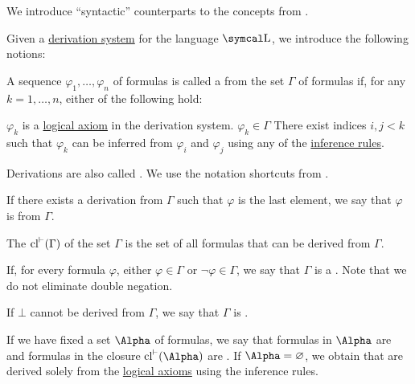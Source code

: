 \begin{definition}\label{def:first_order_proofs}
  We introduce \enquote{syntactic} counterparts to the concepts from .

  Given a \hyperref[def:first_order_derivation_system]{derivation system} for the language \( \CL \), we introduce the following notions:
  \begin{DefEnum}
    A sequence \( \varphi_1, \ldots, \varphi_n \) of formulas is called a  from the set \( \Gamma \) of formulas if, for any \( k = 1, \ldots, n \), either of the following hold:
    \begin{DefEnum}
       \( \varphi_k \) is a \hyperref[def:first_order_derivation_system/axioms]{logical axiom} in the derivation system.
       \( \varphi_k \in \Gamma \)
       There exist indices \( i, j < k \) such that \( \varphi_k \) can be inferred from \( \varphi_i \) and \( \varphi_j \) using any of the \hyperref[def:first_order_derivation_system/rules]{inference rules}.
    \end{DefEnum}

    Derivations are also called . We use the notation shortcuts from .

     If there exists a derivation from \( \Gamma \) such that \( \varphi \) is the last element, we say that \( \varphi \) is  from \( \Gamma \).

     The  \( \operatorname{cl}^{\vdash}(\Gamma) \) of the set \( \Gamma \) is the set of all formulas that can be derived from \( \Gamma \).

    If, for every formula \( \varphi \), either \( \varphi \in \Gamma \) or \( \neg \varphi \in \Gamma \), we say that \( \Gamma \) is a . Note that we do not eliminate double negation.

    If \( \bot \) cannot be derived from \( \Gamma \), we say that \( \Gamma \) is .

     If we have fixed a set \( \Alpha \) of formulas, we say that formulas in \( \Alpha \) are  and formulas in the closure \( \Cl^{\vdash}(\Alpha) \) are . If \( \Alpha = \varnothing \), we obtain  that are derived solely from the \hyperref[logical axioms]{logical axioms} using the inference rules.
  \end{DefEnum}
\end{definition}

